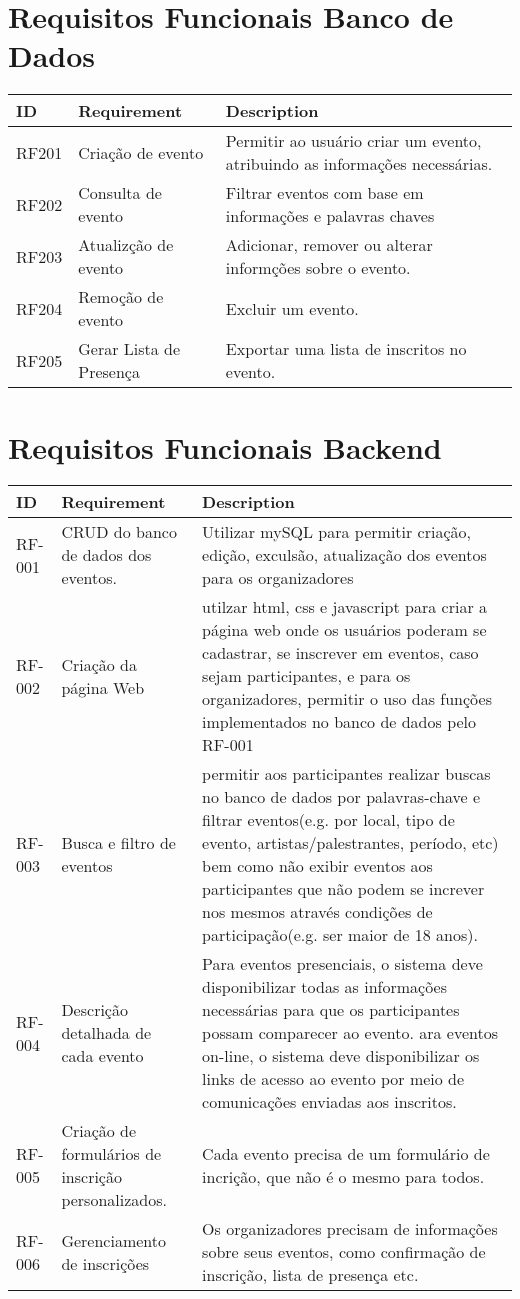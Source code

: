\section{Requisitos Funcionais Banco de Dados}
\begin{tabular}{>{\raggedright}p{1.5cm}>{\raggedright}p{4cm}>{\raggedright}p{10cm}}
\toprule
\textbf{ID} & \textbf{Requirement} & \textbf{Description} \tabularnewline 
\midrule
  RF201 & Criação de evento & Permitir ao usuário criar um evento, atribuindo as informações necessárias.\tabularnewline \hline
  RF202 & Consulta de evento & Filtrar eventos com base em informações e palavras chaves\tabularnewline \hline
  RF203 & Atualizção de evento & Adicionar, remover ou alterar informções sobre o evento.\tabularnewline \hline
  RF204 & Remoção de evento & Excluir um evento.\tabularnewline \hline
  RF205 & Gerar Lista de Presença & Exportar uma lista de inscritos no evento.\tabularnewline 
\bottomrule
\end{tabular}

\section{Requisitos Funcionais Backend}

\begin{tabular}{>{\raggedright}p{1.5cm}>{\raggedright}p{4cm}>{\raggedright}p{10cm}}
\toprule
\textbf{ID} & \textbf{Requirement} & \textbf{Description} \tabularnewline 
\midrule
RF-001 & CRUD do banco de dados dos eventos. & Utilizar mySQL para permitir criação, edição, exculsão, atualização dos eventos para os organizadores \tabularnewline \hline
RF-002 & Criação da página Web & utilzar html, css e javascript para criar a página web onde os usuários poderam se cadastrar, se inscrever em eventos,  caso sejam participantes, e para os organizadores, permitir o uso das funções implementados no banco de dados pelo RF-001 \tabularnewline \hline
RF-003 & Busca e filtro de eventos & permitir aos participantes realizar buscas no banco de dados por palavras-chave e filtrar eventos(e.g. por local, tipo de evento, artistas/palestrantes, período, etc) bem como não exibir eventos aos participantes que não podem se increver nos mesmos através condições de participação(e.g. ser maior de 18 anos). \tabularnewline \hline
RF-004 & Descrição detalhada de cada evento & Para eventos presenciais, o sistema deve disponibilizar todas as informações necessárias para que os participantes possam comparecer ao evento. ara eventos on-line, o sistema deve disponibilizar os links de acesso ao evento por meio de comunicações enviadas aos inscritos. \tabularnewline \hline
RF-005 & Criação de formulários de inscrição personalizados. & Cada evento precisa de um formulário de incrição, que não é o mesmo para todos. \tabularnewline \hline
RF-006 & Gerenciamento de inscrições & Os organizadores precisam de informações sobre seus eventos, como conﬁrmação de inscrição, lista de presença etc. \tabularnewline
\bottomrule
\end{tabular}


